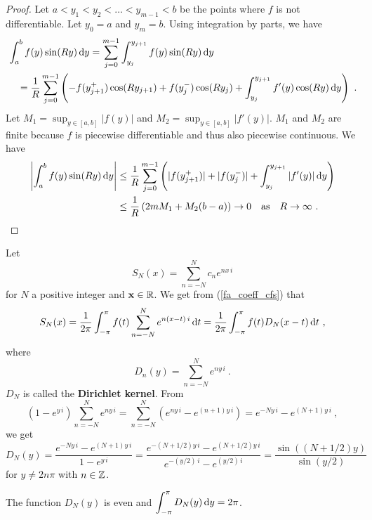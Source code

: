 \begin{proof}
Let $a < y_1 < y_2 < \ldots < y_{m-1} < b$ be the points where $f$ is
not differentiable.  Let $y_0 = a$ and $y_m = b$.  Using integration
by parts, we have
\begin{align*}
&\int_a^b  f(y) \sin(Ry) \,\mathrm{d}{y}
= \sum_{j=0}^{m-1} \int_{y_j}^{y_{j+1}} f(y) \sin(Ry) \,\mathrm{d}{y} \\
& \quad = \frac{1}{R} \sum_{j=0}^{m-1} \left( -f(y_{j+1}^+)\cos(Ry_{j+1})
+ f(y_j^-)\cos(Ry_j) + \int_{y_j}^{y_{j+1}} f'(y) \cos(Ry) \,\mathrm{d}{y} \right) \ .
\end{align*}
Let $M_1 = \sup_{y\in[a,b]} |f(y)|$ and $M_2 = \sup_{y\in[a,b]}|f'(y)|$.
$M_1$ and $M_2$ are finite because $f$ is piecewise differentiable and
thus also piecewise continuous.  We have
\begin{align*}
\left| \int_a^b  f(y) \sin(Ry) \,\mathrm{d}{y} \right|
& \leq \frac{1}{R} \sum_{j=0}^{m-1} \left( |f(y_{j+1}^+)| + |f(y_j^-)|
+ \int_{y_j}^{y_{j+1}} |f'(y)| \,\mathrm{d}{y} \right) \\
& \leq \frac{1}{R} \left( 2m M_1 + M_2 (b-a) \right) \to 0 \quad \text{as}
\quad R \to \infty \ .  \qedhere
\end{align*}
\end{proof}

Let
\[
S_N(x) = \sum_{n=-N}^N c_n e^{n x\, i}
\]
for $N$ a positive integer and $\mathbf{x} \in \mathbb{R}$.  We get from
(\ref{fa_coeff_cfs}) that
\[
S_N(x) = \frac{1}{2\pi} \int_{-\pi}^{\pi} f(t) \sum_{n=-N}^N
e^{n(x-t)\, i} \,\mathrm{d}{t}
= \frac{1}{2\pi} \int_{-\pi}^{\pi} f(t) D_N(x-t) \,\mathrm{d}{t} \ ,
\]
where
\[
D_n(y) = \sum_{n=-N}^N e^{n y \, i} \ .
\]
$D_N$ is called the {\bfseries Dirichlet kernel}.
From
\[
(1-e^{y\, i}) \sum_{n=-N}^N e^{n y \, i} = 
\sum_{n=-N}^N \left( e^{n y \, i} - e^{(n+1) y \, i} \right)
= e^{-N y \, i} - e^{(N+1) y \, i} \ ,
\]
we get
\[
D_N(y) = \frac{e^{-N y \, i} - e^{(N+1) y \, i}}{1-e^{y\, i}}
= \frac{e^{-(N+1/2) y \, i} - e^{(N+1/2) y \, i}}{e^{-(y/2)\,i}-e^{(y/2)\, i}}
= \frac{ \sin( (N+1/2)y)}{\sin(y/2)}
\]
for $y \neq 2 n \pi$ with $n \in \mathbb{Z}$.

The function $D_N(y)$ is even and
$\displaystyle \int_{-\pi}^{\pi} D_N(y) \,\mathrm{d}{y} = 2\pi$.

